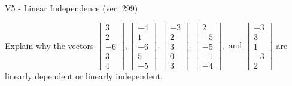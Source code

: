 \begin{exercise}
  \begin{exerciseTitle}V5 - Linear Independence (ver. 299)\end{exerciseTitle}
  \begin{exerciseStatement}
    Explain why the vectors \(\left[\begin{array}{r}
3 \\
2 \\
-6 \\
3 \\
4
\end{array}\right] , \left[\begin{array}{r}
-4 \\
1 \\
-6 \\
5 \\
-5
\end{array}\right] , \left[\begin{array}{r}
-3 \\
2 \\
3 \\
0 \\
3
\end{array}\right] , \left[\begin{array}{r}
2 \\
-5 \\
-5 \\
-1 \\
-4
\end{array}\right] , \text{ and } \left[\begin{array}{r}
-3 \\
3 \\
1 \\
-3 \\
2
\end{array}\right]\) are linearly dependent or linearly independent.	



\end{exerciseStatement}
\end{exercise}
